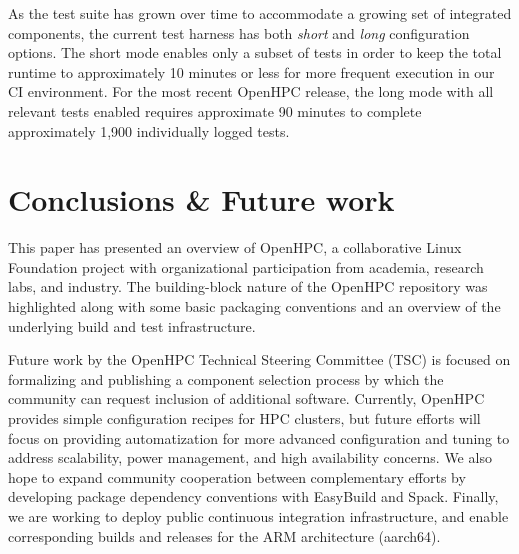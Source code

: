 \documentclass{sig-alternate-05-2015}
\begin{document}
As the test suite has grown over time to accommodate a growing set of integrated
components, the current test harness has both {\em short} and {\em long}
configuration options.  The short mode enables only a subset of tests in order
to keep the total runtime to approximately 10 minutes or less for more frequent
execution in our CI environment. For the most recent OpenHPC release, the long
mode with all relevant tests enabled requires approximate 90 minutes to complete
approximately 1,900 individually logged tests.


\section{Conclusions \& Future work}
This paper has presented an overview of OpenHPC, a collaborative Linux
Foundation project with organizational participation from academia, research
labs, and industry. The building-block nature of the OpenHPC repository was
highlighted along with some basic packaging conventions and an overview of the
underlying build and test infrastructure.

Future work by the OpenHPC Technical Steering Committee (TSC) is focused on
formalizing and publishing a component selection process by which the community
can request inclusion of additional software. Currently, OpenHPC provides simple
configuration recipes for HPC clusters, but future efforts will focus on 
providing automatization for more advanced configuration and tuning to address
scalability, power management, and high availability concerns. We also hope to
expand community cooperation between complementary efforts by 
developing package dependency conventions with EasyBuild and Spack. Finally, we
are working to deploy public continuous integration infrastructure, and
enable corresponding builds and releases for the ARM architecture (aarch64).




\end{document}
